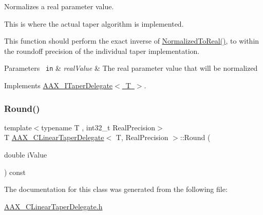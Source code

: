 Normalizes a real parameter value. 

This is where the actual taper algorithm is implemented.

This function should perform the exact inverse of \mbox{\hyperlink{a01493_a2e38e1451e418425aceae090f2420e3e}{Normalized\+To\+Real()}}, to within the roundoff precision of the individual taper implementation.


\begin{DoxyParams}[1]{Parameters}
\mbox{\texttt{ in}}  & {\em real\+Value} & The real parameter value that will be normalized \\
\hline
\end{DoxyParams}


Implements \mbox{\hyperlink{a01881_ab017fe7e1c1dcf6191f8b4e8b09f8add}{A\+A\+X\+\_\+\+I\+Taper\+Delegate$<$ T $>$}}.

\mbox{\label{a01493_a08b3b4c042385e73ce79e94c0dbf54ce}} 
\subsubsection{\texorpdfstring{Round()}{Round()}}
{\footnotesize\ttfamily template$<$typename T , int32\+\_\+t Real\+Precision$>$ \\
T \mbox{\hyperlink{a01493}{A\+A\+X\+\_\+\+C\+Linear\+Taper\+Delegate}}$<$ T, Real\+Precision $>$\+::Round (\begin{DoxyParamCaption}\item[{double}]{i\+Value }\end{DoxyParamCaption}) const\hspace{0.3cm}{\ttfamily [protected]}}



The documentation for this class was generated from the following file\+:\begin{DoxyCompactItemize}
\item 
\mbox{\hyperlink{a00437}{A\+A\+X\+\_\+\+C\+Linear\+Taper\+Delegate.\+h}}\end{DoxyCompactItemize}
